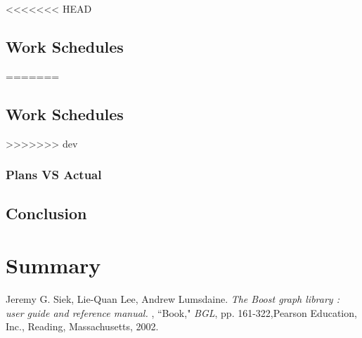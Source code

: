 \documentclass[a4paper, 12pt, english]{book}
\begin{document}
<<<<<<< HEAD
\section{Work Schedules}
=======



\section{Work Schedules}





>>>>>>> dev
\subsection{Plans VS Actual}
\section{Conclusion}
\chapter{Summary}
\begin{thebibliography}{12}
Jeremy G. Siek,
Lie-Quan Lee, Andrew Lumsdaine.
\textit{The Boost graph library : user guide and reference manual.} , ``Book," \emph{BGL}, pp. 161-322,Pearson Education, Inc., Reading, Massachusetts, 2002.
\end{thebibliography}
\end{document}
